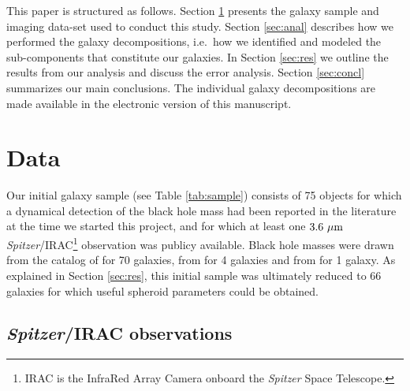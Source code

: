 \documentclass[preprint2]{emulateapj}
\begin{document}
This paper is structured as follows.
Section \ref{sec:data} presents the galaxy sample and imaging data-set used to conduct this study. 
Section \ref{sec:anal} describes how we performed the galaxy decompositions, 
i.e.~how we identified and modeled the sub-components that constitute our galaxies. 
In Section \ref{sec:res} we outline the results from our analysis and discuss the error analysis. 
Section \ref{sec:concl} summarizes our main conclusions. 
The individual galaxy decompositions are made available in the electronic version of this manuscript.


\section{Data}
\label{sec:data}
Our initial galaxy sample (see Table \ref{tab:sample}) consists of 75 objects for which a dynamical detection of the black hole mass 
had been reported in the literature at the time we started this project, 
and for which at least one $3.6~\rm \mu m$ \emph{Spitzer}/IRAC\footnote{IRAC is the InfraRed Array Camera onboard the \emph{Spitzer} Space Telescope.} 
observation was publicy available.
Black hole masses were drawn from the catalog of \citet{grahamscott2013} for 70 galaxies,
from \citet{rusli2013bhmassesDM} for 4 galaxies and from \citet{greenhill2003} for 1 galaxy. 
As explained in Section \ref{sec:res}, 
this initial sample was ultimately reduced to 66 galaxies for which useful spheroid parameters could be obtained.




\subsection{\emph{Spitzer}/IRAC observations}
\end{document}
